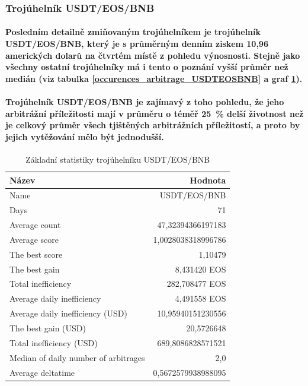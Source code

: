 \documentclass[thesis=B,czech]{FITthesis}[2019/03/21]
\begin{document}
\subsubsection{Trojúhelník USDT/EOS/BNB}
\paragraph{
Posledním detailně zmiňovaným trojúhelníkem je trojúhelník USDT/EOS/BNB, který je s průměrným denním ziskem 10,96 amerických dolarů na čtvrtém místě z pohledu výnosnosti. Stejně jako všechny ostatní trojúhelníky má i tento o poznání vyšší průměr než medián (viz tabulka \ref{occurences_arbitrage_USDTEOSBNB} a graf \ref{USDTEOSBNB_stats}).
}
\paragraph{
Trojúhelník USDT/EOS/BNB je zajímavý z toho pohledu, že jeho arbitrážní příležitosti mají v průměru o téměř 25~\% delší životnost než je celkový průměr všech tjištěných arbitrážních příležitostí, a proto by jejich vytěžování mělo být jednodušší.
}

\begin{table}\centering
\caption{Základní statistiky trojúhelníku USDT/EOS/BNB}
\label{USDTEOSBNB_stats}
\begin{tabular}{|| l | r ||}
\hline Název & Hodnota \\ 
\hline\hline Name & USDT/EOS/BNB \\ 
\hline Days & 71 \\ 
\hline Average count & 47,32394366197183 \\ 
\hline Average score & 1,0028038318996786 \\ 
\hline The best score & 1,10479 \\ 
\hline The best gain & 8,431420 EOS \\ 
\hline Total inefficiency & 282,708477 EOS \\ 
\hline Average daily inefficiency & 4,491558 EOS \\ 
\hline Average daily inefficiency (USD) & 10,95940151230556 \\ 
\hline The best gain (USD) & 20,5726648 \\ 
\hline Total inefficiency (USD) & 689,8086828571521 \\ 
\hline Median of daily number of arbitrages & 2,0 \\ 
\hline Average deltatime & 0,5672579938988095 \\ 
\hline
\end{tabular}
\end{table}
\end{document}
